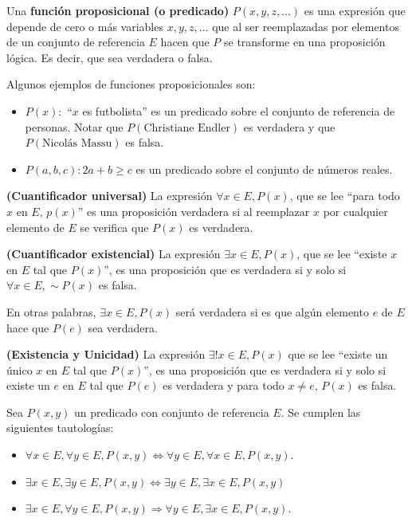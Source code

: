 \begin{definicion}
	Una \textbf{función proposicional (o predicado)}  $P(x, y, z, ...)$ es una expresión que depende de cero o más variables $x, y, z, ...$ que al ser reemplazadas por elementos de un conjunto de referencia $E$ hacen que $P$ se transforme en una proposición lógica. Es decir, que sea verdadera o falsa. 
\end{definicion}

\begin{ejemplo}
	Algunos ejemplos de funciones proposicionales son: 
	\begin{itemize}
		\item $P(x):$ ``$x$ es futbolista'' es un predicado sobre el conjunto de referencia de personas. Notar que $P(\text{Christiane Endler})$ es verdadera y que $P(\text{Nicolás Massu})$ es falsa. 
		\item $P(a,b,c): 2a + b \geq c$ es un predicado sobre el conjunto de números reales.
	\end{itemize}
\end{ejemplo}

\begin{definicion}
	\textbf{(Cuantificador universal)}
	La expresión $\forall x \in E, P(x)$, que se lee ``para todo $x$ en $E$, $p(x)$'' es una proposición verdadera si al reemplazar $x$ por cualquier elemento de $E$ se verifica que $P(x)$ es verdadera. 
\end{definicion}

\begin{definicion}
	\textbf{(Cuantificador existencial)}
	La expresión $\exists x \in E, P(x)$, que se lee ``existe $x$ en $E$ tal que $P(x)$'', es una proposición que es verdadera si y solo si $\forall x \in E , \sim P(x)$ es falsa. 
	
	En otras palabras, $\exists x \in E, P(x)$ será verdadera si es que algún elemento $e$ de $E$ hace que $P(e)$ sea verdadera. 
\end{definicion}

\begin{definicion}
	\textbf{(Existencia y Unicidad)}
	La expresión $\exists ! x \in E, P(x)$ que se lee ``existe un único $x$ en $E$ tal que $P(x)$'', es una proposición que es verdadera si y solo si existe un $e$ en $E$ tal que $P(e)$ es verdadera y para todo $x \neq e$, $P(x)$ es falsa. 
\end{definicion}

\begin{proposicion}
	Sea $P(x,y)$ un predicado con conjunto de referencia $E$. Se cumplen las siguientes tautologías: 
	\begin{itemize}
		\item $\forall x \in E, \forall y \in E, P(x,y) \iff \forall y \in E, \forall x \in E, P(x,y)$. 
		\item $\exists x \in E, \exists y \in E, P(x,y) \iff \exists y \in E, \exists x \in E, P(x,y)$
		\item $\exists x \in E, \forall y \in E, P(x,y) \Longrightarrow \forall y \in E, \exists x \in E, P(x,y)$. 
	\end{itemize}
\end{proposicion}


